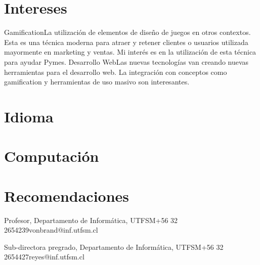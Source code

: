 \documentclass[letter,10pt]{moderncv}
\makeatletter
\renewcommand*{\bibliographyitemlabel}{\@biblabel{\arabic{enumiv}}}
\makeatother
\begin{document}
\section{Intereses}
           {Gamification}{La utilización de elementos de diseño de juegos en otros  contextos. Esta es una técnica moderna para atraer y retener clientes o usuarios utilizada mayormente en marketing y ventas. Mi interés es en la utilización de esta técnica para ayudar Pymes.}
	   {Desarrollo Web}{Las nuevas tecnologías van creando nuevas herramientas para el desarrollo web. La integración con conceptos como gamification y herramientas de uso masivo son interesantes.}

\section{Idioma}


\section{Computaci\'on}


\section{Recomendaciones}

        {Profesor, Departamento de Informática, UTFSM}{+56 32 2654239}{vonbrand@inf.utfsm.cl}{}

        {Sub-directora pregrado, Departamento de Informática, UTFSM}{+56 32 2654427}{reyes@inf.utfsm.cl}{}

\nocite{*}                                                                           
                                                            
\end{document}
